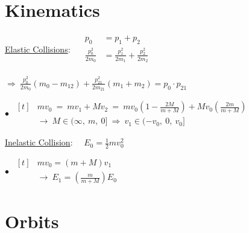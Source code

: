 \documentclass[12pt]{article}
\begin{document}
\section{Kinematics}
\begin{minipage}[t]{.6\textwidth}
    \underline{Elastic Collisions}: \ \ \(
        \begin{aligned}
            p_0 & = p_1 + p_2\\
            \tfrac{p_0^2}{2m_0} & = \tfrac{p_1^2}{2m_1} + \tfrac{p_2^2}{2m_2}\\
        \end{aligned}
    \)

    \vspace{7pt}
    \(\Rightarrow\ \boxed{ 
        \tfrac{p_0^2}{2m_0} (m_0 - m_{12}) + \tfrac{p_{21}^2}{2m_{21}} (m_1 + m_2) = p_0 \cdot p_{21}
    }\)

    \vspace{10pt}\noindent
    \(
        \bullet\ \ \boxed{ \begin{aligned}[t]
            & m v_0 \ =\ m v_1 + M v_2 
                \ =\ 
                m v_0 \left( 1 - \tfrac{2M}{m+M} \right) + M v_0 \left( \tfrac{2m}{m + M} \right) 
                \\[5pt]
            & \rightarrow\
                M \in (\infty,\ m,\ 0] 
                \ \Rightarrow\ 
                v_1 \in (-v_0,\ 0,\ v_0]
        \end{aligned} }
    \)
\end{minipage}
\hfill
\begin{minipage}[t]{.35\textwidth}
    \underline{Inelastic Collision}: \ \ \(E_0 = \tfrac{1}{2} m v_0^2\)

    \vspace{7pt} 
    \(\bullet\ \ \boxed{ \begin{aligned}[t]
        & m v_0 = (m + M) v_1 \\[5pt]
        & \rightarrow\ E_1 = \left( \tfrac{m}{m+M} \right) E_0
    \end{aligned}} \)
\end{minipage}

\vspace{10pt}
\section{Orbits}
\end{document}
